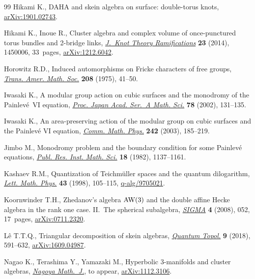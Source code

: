 \documentclass[10pt,a4paper]{amsart}
\numberwithin{equation}{section}
\begin{document}
\begin{thebibliography}{99}
Hikami K., {DAHA} and skein algebra on surface: double-torus knots,
 \href{https://arxiv.org/abs/1901.02743}{arXiv:1901.02743}.

Hikami K., Inoue R., Cluster algebra and complex volume of once-punctured torus
 bundles and 2-bridge links, \href{https://doi.org/10.1142/S0218216514500060}{\textit{J.~Knot Theory Ramifications}} \textbf{23}
 (2014), 1450006, 33~pages, \href{https://arxiv.org/abs/1212.6042}{arXiv:1212.6042}.

Horowitz R.D., Induced automorphisms on {F}ricke characters of free groups,
 \href{https://doi.org/10.2307/1997274}{\textit{Trans. Amer. Math. Soc.}} \textbf{208} (1975), 41--50.

Iwasaki K., A modular group action on cubic surfaces and the monodromy of the
 {P}ainlev\'{e}~{VI} equation, \href{https://doi.org/10.3792/pjaa.78.131}{\textit{Proc. Japan Acad. Ser.~A Math. Sci.}}
 \textbf{78} (2002), 131--135.

Iwasaki K., An area-preserving action of the modular group on cubic surfaces
 and the {P}ainlev\'{e} {VI} equation, \href{https://doi.org/10.1007/s00220-003-0940-3}{\textit{Comm. Math. Phys.}} \textbf{242}
 (2003), 185--219.

Jimbo M., Monodromy problem and the boundary condition for some {P}ainlev\'{e}
 equations, \href{https://doi.org/10.2977/prims/1195183300}{\textit{Publ. Res. Inst. Math. Sci.}} \textbf{18} (1982),
 1137--1161.

Kashaev R.M., Quantization of {T}eichm\"{u}ller spaces and the quantum
 dilogarithm, \href{https://doi.org/10.1023/A:1007460128279}{\textit{Lett. Math. Phys.}} \textbf{43} (1998), 105--115,
 \href{https://arxiv.org/abs/q-alg/9705021}{q-alg/9705021}.

Koornwinder T.H., Zhedanov's algebra {$\rm AW(3)$} and the double affine
 {H}ecke algebra in the rank one case. {II}.~{T}he spherical subalgebra,
 \href{https://doi.org/10.3842/SIGMA.2008.052}{\textit{SIGMA}} \textbf{4} (2008), 052, 17~pages, \href{https://arxiv.org/abs/0711.2320}{arXiv:0711.2320}.

L\^{e} T.T.Q., Triangular decomposition of skein algebras, \href{https://doi.org/10.4171/QT/115}{\textit{Quantum
 Topol.}} \textbf{9} (2018), 591--632, \href{https://arxiv.org/abs/1609.04987}{arXiv:1609.04987}.

Nagao K., Terashima Y., Yamazaki M., Hyperbolic 3-manifolds and cluster
 algebras, \href{https://doi.org/10.1017/nmj.2017.39}{\textit{Nagoya Math.~J.}}, {t}o appear, \href{https://arxiv.org/abs/1112.3106}{arXiv:1112.3106}.


\end{thebibliography}
\end{document}
